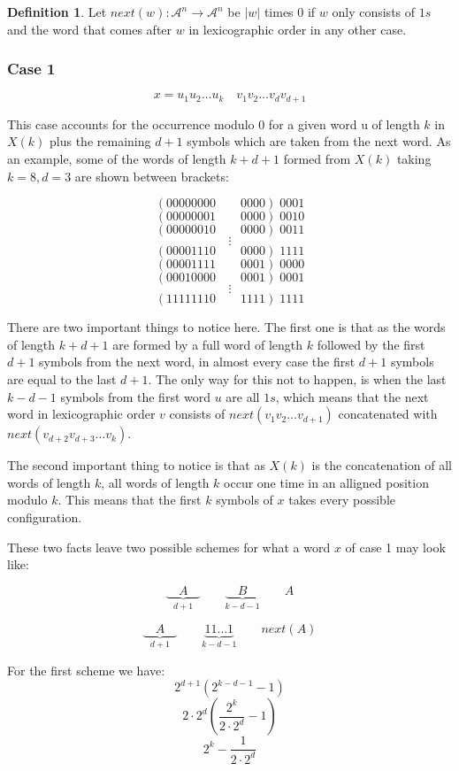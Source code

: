 \documentclass[11pt,a4paper]{tesis}
\theoremstyle{definition}
\newtheorem{definition}{Definition}[section]
\begin{document}
\begin{definition}
    Let $next(w):\mathcal{A}^n \rightarrow \mathcal{A}^n $ be $|w|$ times 0 if $w$ only consists of $1s$ and the word that comes after $w$ in lexicographic order in any other case.
\end{definition}

\subsubsection{Case 1}
$$x = u_1 u_2 \dots u_k \quad v_1 v_2 \dots v_{d} v_{d + 1}$$

This case accounts for the occurrence modulo 0 for a given word u of length $k$ in $X(k)$ plus the remaining $d + 1$ symbols which are taken from the next word.
As an example, some of the words of length $k + d + 1$ formed from $X(k)$ taking $k = 8, d = 3$ are shown between brackets:

$$( 00000000 \qquad 0000 ) \; 0001$$
$$( 00000001 \qquad 0000 ) \; 0010$$
$$( 00000010 \qquad 0000 ) \; 0011$$
$$\vdots$$
$$( 00001110 \qquad 0000 ) \; 1111$$
$$( 00001111 \qquad 0001 ) \; 0000$$
$$( 00010000 \qquad 0001 ) \; 0001$$
$$\vdots$$
$$( 11111110 \qquad 1111 ) \; 1111$$

There are two important things to notice here. The first one is that as the words of length $k + d + 1$ are formed by a full word of length $k$ followed by the first $d + 1$ symbols from the next word, in almost every case the first $d + 1$ symbols are equal to the last $d + 1$.
The only way for this not to happen, is when the last $k - d - 1$ symbols from the first word $u$ are all $1s$, which means that the next word in lexicographic order $v$ consists of $next(v_1 v_2 \dots v_{d + 1})$ concatenated with $next(v_{d + 2} v_{d + 3} \dots v_{k})$.

The second important thing to notice is that as $X(k)$ is the concatenation of all words of length $k$, all words of length $k$ occur one time in an alligned position modulo $k$. This means that the first $k$ symbols of $x$ takes every possible configuration. 

These two facts leave two possible schemes for what a word $x$ of case 1 may look like:

$$\underbrace{\quad A \quad }_{d +1} \qquad \underbrace{\quad B \quad }_{k - d - 1}  \qquad A$$


$$\underbrace{\quad A \quad }_{d +1} \qquad \underbrace{ 11 \dots 1  }_{k - d - 1}  \qquad next(A) $$

For the first scheme we have:
$$2^{d + 1}  (2^{k - d - 1} - 1)$$
$$ 2\cdot2^{d}  (\frac{2^k}{2\cdot2^d} - 1)$$
$$ 2^k - \frac{1}{2\cdot2^{d} }$$
\end{document}
